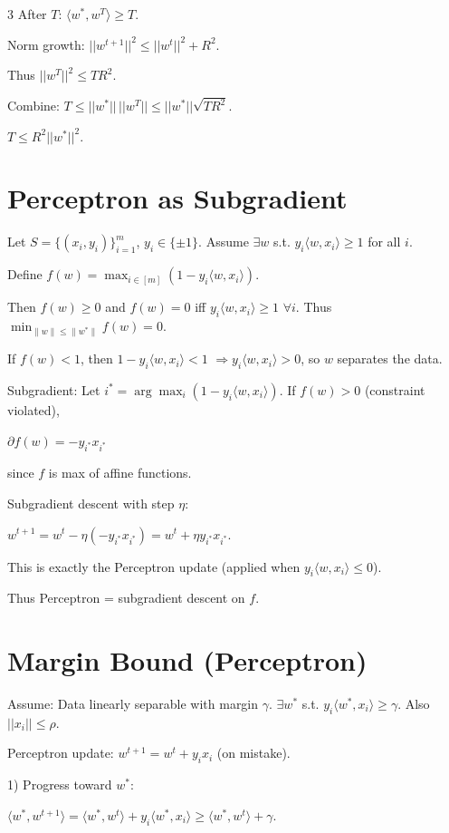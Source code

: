 \documentclass[8pt,fleqn]{extarticle}
\begin{document}
\begin{multicols}{3}
After $T$: $\langle w^*,w^T\rangle\ge T$.

Norm growth:
$||w^{t+1}||^2
\le ||w^t||^2+R^2$.

Thus $||w^T||^2\le TR^2$.

Combine:
$T \le ||w^*||\,||w^T||
\le ||w^*||\sqrt{TR^2}$.

$T\le R^2||w^*||^2$.

\section*{Perceptron as Subgradient}

Let $S=\{(x_i,y_i)\}_{i=1}^m$, $y_i\in\{\pm1\}$.
Assume $\exists w$ s.t. $y_i\langle w,x_i\rangle \ge 1$ for all $i$.

Define
$f(w)=\max_{i\in[m]}(1-y_i\langle w,x_i\rangle)$.

Then $f(w)\ge0$ and $f(w)=0$ iff $y_i\langle w,x_i\rangle\ge1$ $\forall i$.
Thus $\min_{\|w\|\le\|w^*\|} f(w)=0$.

If $f(w)<1$, then
$1-y_i\langle w,x_i\rangle<1$
$\Rightarrow y_i\langle w,x_i\rangle>0$,
so $w$ separates the data.

Subgradient:
Let $i^*=\arg\max_i (1-y_i\langle w,x_i\rangle)$.
If $f(w)>0$ (constraint violated),

$\partial f(w)= -y_{i^*}x_{i^*}$

since $f$ is max of affine functions.

Subgradient descent with step $\eta$:

$w^{t+1}=w^t-\eta(-y_{i^*}x_{i^*})
= w^t+\eta y_{i^*}x_{i^*}$.

This is exactly the Perceptron update
(applied when $y_i\langle w,x_i\rangle \le 0$).

Thus Perceptron = subgradient descent on $f$.


\section*{Margin Bound (Perceptron)}

Assume:
Data linearly separable with margin $\gamma$.
$\exists w^*$ s.t. $y_i\langle w^*,x_i\rangle \ge \gamma$.
Also $||x_i||\le\rho$.

Perceptron update:
$w^{t+1}=w^t+y_ix_i$ (on mistake).

1) Progress toward $w^*$:

$\langle w^*,w^{t+1}\rangle
=\langle w^*,w^t\rangle
+y_i\langle w^*,x_i\rangle
\ge
\langle w^*,w^t\rangle+\gamma$.


\end{multicols}
\end{document}
